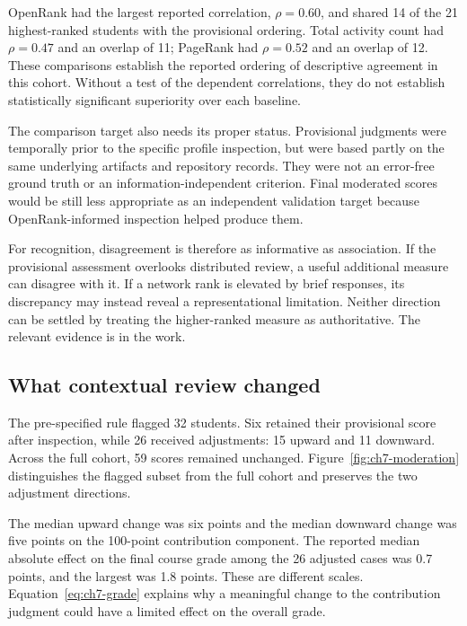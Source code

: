 OpenRank had the largest reported correlation, \(\rho=0.60\), and shared 14 of the 21 highest-ranked students with the provisional ordering. Total activity count had \(\rho=0.47\) and an overlap of 11; PageRank had \(\rho=0.52\) and an overlap of 12. These comparisons establish the reported ordering of descriptive agreement in this cohort. Without a test of the dependent correlations, they do not establish statistically significant superiority over each baseline.

The comparison target also needs its proper status. Provisional judgments were temporally prior to the specific profile inspection, but were based partly on the same underlying artifacts and repository records. They were not an error-free ground truth or an information-independent criterion. Final moderated scores would be still less appropriate as an independent validation target because OpenRank-informed inspection helped produce them.

For recognition, disagreement is therefore as informative as association. If the provisional assessment overlooks distributed review, a useful additional measure can disagree with it. If a network rank is elevated by brief responses, its discrepancy may instead reveal a representational limitation. Neither direction can be settled by treating the higher-ranked measure as authoritative. The relevant evidence is in the work.

\subsection{What contextual review changed}
The pre-specified rule flagged 32 students. Six retained their provisional score after inspection, while 26 received adjustments: 15 upward and 11 downward. Across the full cohort, 59 scores remained unchanged. Figure~\ref{fig:ch7-moderation} distinguishes the flagged subset from the full cohort and preserves the two adjustment directions.



The median upward change was six points and the median downward change was five points on the 100-point contribution component. The reported median absolute effect on the final course grade among the 26 adjusted cases was 0.7 points, and the largest was 1.8 points. These are different scales. Equation~\ref{eq:ch7-grade} explains why a meaningful change to the contribution judgment could have a limited effect on the overall grade.

